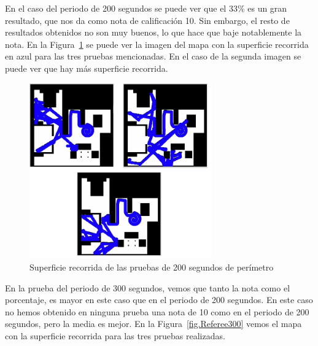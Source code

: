 En el caso del periodo de 200 segundos se puede ver que el 33\% es un gran resultado, que nos da como nota de calificación 10. Sin embargo, el resto de resultados obtenidos no son muy buenos, lo que hace que baje notablemente la nota. En la Figura~\ref{fig.Referee200} se puede ver la imagen del mapa con la superficie recorrida en azul para las tres pruebas mencionadas. En el caso de la segunda imagen se puede ver que hay más superficie recorrida.


\begin{figure}[H]
  \begin{center}
    \includegraphics[width=0.7\textwidth]{figures/Vacuum/Referee200.png}
		\caption{Superficie recorrida de las pruebas de 200 segundos de perímetro}
		\label{fig.Referee200}
		\end{center}
\end{figure}

En la prueba del periodo de 300 segundos, vemos que tanto la nota como el porcentaje, es mayor en este caso que en el periodo de 200 segundos. En este caso no hemos obtenido en ninguna prueba una nota de 10 como en el periodo de 200 segundos, pero la media es mejor. En la Figura~\ref{fig.Referee300} vemos el mapa con la superficie recorrida para las tres pruebas realizadas.

